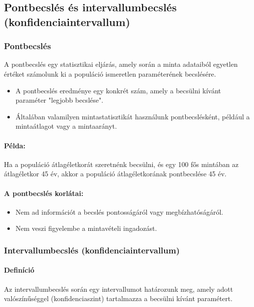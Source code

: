 \documentclass[a4paper,12pt]{article}
\begin{document}
    \subsection{Pontbecslés és intervallumbecslés (konfidenciaintervallum)}

    \subsubsection{Pontbecslés}

    A pontbecslés egy statisztikai eljárás, amely során a minta adataiból egyetlen értéket számolunk ki a populáció ismeretlen paraméterének becslésére.

    \begin{itemize}
        \item A pontbecslés eredménye egy konkrét szám, amely a becsülni kívánt paraméter "legjobb becslése".
        \item Általában valamilyen mintastatisztikát használunk pontbecslésként, például a mintaátlagot vagy a mintaarányt.
    \end{itemize}

    \paragraph{Példa:} Ha a populáció átlagéletkorát szeretnénk becsülni, és egy 100 fős mintában az átlagéletkor 45 év, akkor a populáció átlagéletkorának pontbecslése 45 év.

    \paragraph{A pontbecslés korlátai:}
    \begin{itemize}
        \item Nem ad információt a becslés pontosságáról vagy megbízhatóságáról.
        \item Nem veszi figyelembe a mintavételi ingadozást.
    \end{itemize}

    \subsubsection{Intervallumbecslés (konfidenciaintervallum)}

    \paragraph{Definíció}
    Az intervallumbecslés során egy intervallumot határozunk meg, amely adott valószínűséggel (konfidenciaszint) tartalmazza a becsülni kívánt paramétert.
\end{document}
